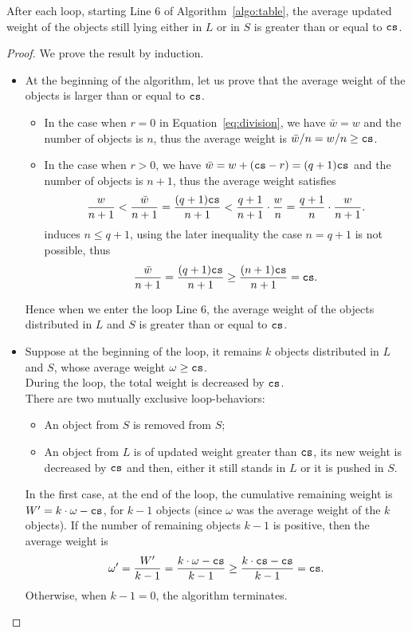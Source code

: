 \begin{lemma}
\label{lem:seq_increase}
    After each loop, starting Line 6 of Algorithm~\ref{algo:table}, the average updated weight of the objects still lying either in $L$
    or in $S$ is greater than or equal to $\texttt{cs}$.
\end{lemma}
\begin{proof}
    We prove the result by induction.
    \begin{itemize}
        \item At the beginning of the algorithm, let us prove that the average weight of the objects is larger than or equal to $\texttt{cs}$.
            \begin{itemize}
                \item In the case when $r=0$ in Equation~\eqref{eq:division},
                    we have $\bar{w} = w$ and the number of objects is $n$, thus the average weight is $\bar{w}/n = w/n \geq \texttt{cs}$.
                \item In the case when $r>0$, we have $\bar{w} = w + (\texttt{cs} - r) = (q+1)\texttt{cs}$ and the number of objects is $n+1$, thus the average weight satisfies
                    \[
                        \frac{w}{n+1} < \frac{\bar{w}}{n+1} = \frac{(q+1)\texttt{cs}}{n+1} < \frac{q+1}{n+1}\cdot\frac{w}{n} = \frac{q+1}{n}\cdot \frac{w}{n+1}.
                    \]
                     induces $n\leq q+1$, using the later inequality the case $n=q+1$ is not possible,
                    thus
                    \[
                         \frac{\bar{w}}{n+1} = \frac{(q+1)\texttt{cs}}{n+1} \geq \frac{(n+1)\texttt{cs}}{n+1} = \texttt{cs}.
                    \]
            \end{itemize}
            Hence when we enter the loop Line 6, the average weight of the objects distributed in $L$ and $S$ is greater than or equal to $\texttt{cs}$.
        \item Suppose at the beginning of the loop, it remains $k$ objects distributed in $L$ and $S$, 
            whose average weight $\omega \geq \texttt{cs}$.\\
            During the loop, the total weight is decreased by $\texttt{cs}$.\\
            There are two mutually exclusive loop-behaviors:
            \begin{itemize}
                \item An object from $S$ is removed from $S$;
                \item An object from $L$ is of updated weight greater than $\texttt{cs}$, its new weight is decreased by $\texttt{cs}$
                    and then, either it still stands in $L$ or it is pushed in $S$.
            \end{itemize}
            In the first case, at the end of the loop, the cumulative remaining weight is $W' = k\cdot \omega - \texttt{cs}$,
            for $k-1$ objects (since $\omega$ was the average weight of the $k$ objects). 
            If the number of remaining objects $k-1$ is positive, then the average weight is
            \[
                \omega' = \frac{W'}{k-1} = \frac{k\cdot \omega - \texttt{cs}}{k-1}  \geq \frac{k\cdot \texttt{cs} - \texttt{cs}}{k-1} = \texttt{cs}.
            \]
            Otherwise, when $k-1 = 0$, the algorithm terminates.\\


\end{itemize}
\end{proof}
